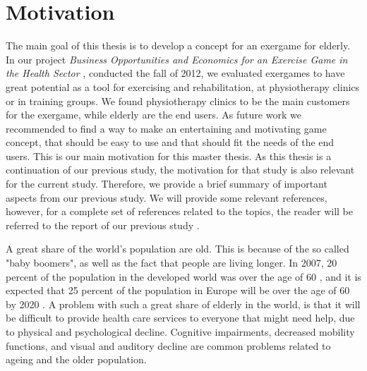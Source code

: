 \chapter{Motivation}
\label{chap:background}

The main goal of this thesis is to develop a concept for an exergame for elderly. In our project \emph{Business Opportunities and Economics for an Exercise Game in the Health Sector} \cite{project}, conducted the fall of 2012, we evaluated exergames to have great potential as a tool for exercising and rehabilitation, at physiotherapy clinics or in training groups. We found physiotherapy clinics to be the main customers for the exergame, while elderly are the end users. As future work we recommended to find a way to make an entertaining and motivating game concept, that should be easy to use and that should fit the needs of the end users. This is our main motivation for this master thesis. As this thesis is a continuation of our previous study, the motivation for that study is also relevant for the current study. Therefore, we provide a brief summary of important aspects from our previous study. We will provide some relevant references, however, for a complete set of references related to the topics, the reader will be referred to the report of our previous study \cite{project}.

A great share of the world's population are old. This is because of the so called "baby boomers", as well as the fact that people are living longer. In 2007, 20 percent of the population in the developed world was over the age of 60 \cite{dickinson2007methods}, and it is expected that 25 percent of the population in Europe will be over the age of 60 by 2020 \cite{ijsselsteijn2007digital}. A problem with such a great share of elderly in the world, is that it will be difficult to provide health care services to everyone that might need help, due to physical and psychological decline. Cognitive impairments, decreased mobility functions, and visual and auditory decline are common problems related to ageing and the older population.

